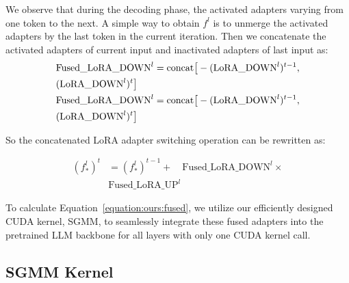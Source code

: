 We observe that during the decoding phase, the activated adapters varying from one token to the next. A simple way to obtain $f^l$ is to unmerge the activated adapters by the last token in the current iteration. Then we concatenate the activated adapters of current input and inactivated adapters of last input as:
\begin{align}\label{equation:ours:lora_unified_fused}
    &\text{Fused\_LoRA\_DOWN}^l = \text{concat}\big[-(\text{LoRA\_DOWN}^l)^{t-1}, \nonumber \\
    &\hfill (\text{LoRA\_DOWN}^l)^{t}\big] \\
     &\text{Fused\_LoRA\_DOWN}^l = \text{concat}\big[-(\text{LoRA\_DOWN}^l)^{t-1}, \nonumber \\
    &\hfill (\text{LoRA\_DOWN}^l)^{t}\big]   
\end{align}


So the concatenated LoRA adapter switching operation can be rewritten as:

\begin{equation}\label{equation:ours:fused}
\begin{split}
    (f^l_*)^t &= (f^l_*)^{t-1} + \quad \text{Fused\_LoRA\_DOWN}^l \times \\ &\text{Fused\_LoRA\_UP}^l
\end{split}
\end{equation}

To calculate Equation~\ref{equation:ours:fused}, we utilize our efficiently designed CUDA kernel, SGMM, to seamlessly integrate these fused adapters into the pretrained LLM backbone for all layers with only one CUDA kernel call.

\subsection{SGMM Kernel}    \label{section:method:sgmm}

